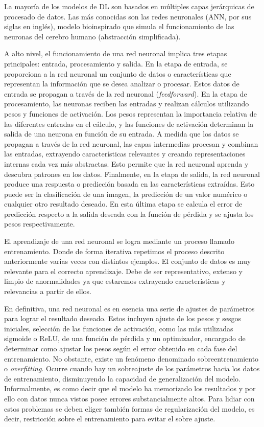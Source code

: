 La mayoría de los modelos de DL son basados en múltiples capas jerárquicas de 
procesado de datos. Las más conocidas son las redes neuronales (ANN, por sus siglas 
en inglés), modelo bioinspirado que simula el funcionamiento de las neuronas del cerebro
humano (abstracción simplificada)\cite{ANNForPattern,ANNCambridge}. 

A alto nivel, el funcionamiento de una red neuronal implica tres etapas principales: 
entrada, procesamiento y salida. En la etapa de entrada, se proporciona a la red 
neuronal un conjunto de datos o características que representan la información 
que se desea analizar o procesar. Estos datos de entrada se propagan a través 
de la red neuronal (\emph{feedforward}). En la etapa de procesamiento, las neuronas reciben las entradas 
y realizan cálculos utilizando pesos y funciones de activación. Los pesos representan 
la importancia relativa de las diferentes entradas en el cálculo, y las funciones 
de activación determinan la salida de una neurona en función de su entrada. A medida que los datos se propagan a través de la red neuronal, las capas intermedias 
procesan y combinan las entradas, extrayendo características relevantes y creando 
representaciones internas cada vez más abstractas. Esto permite que la red neuronal aprenda y 
descubra patrones en los datos. Finalmente, en la etapa de salida, la red neuronal 
produce una respuesta o predicción basada en las características extraídas. 
Esto puede ser la clasificación de una imagen, la predicción de un valor numérico o 
cualquier otro resultado deseado. En esta última etapa se calcula el error de 
predicción respecto a la salida deseada con la función de pérdida y se ajusta 
los pesos respectivamente.

El aprendizaje de una red neuronal se logra mediante un proceso llamado entrenamiento.
Donde de forma iterativa repetimos el proceso descrito anteriormente varias veces 
con distintos ejemplos. El conjunto de datos es muy relevante para el correcto 
aprendizaje. Debe de ser representativo, extenso y limpio de anormalidades ya que 
estaremos extrayendo características y relevancias a partir de ellos.

En definitiva, una red neuronal es en esencia una serie de ajustes de parámetros para lograr el resultado deseado. 
Estos incluyen ajuste de los pesos y sesgos iniciales, selección de las funciones de activación, 
como las más utilizadas sigmoide o ReLU, de una función de pérdida y un optimizador, 
encargado de determinar como ajustar los pesos según el error obtenido en cada fase del entrenamiento.
No obstante, existe un fenómeno denominado sobreentrenamiento o \emph{overfitting}. 
Ocurre cuando hay un sobreajuste de los parámetros
hacia los datos de entrenamiento, disminuyendo la capacidad de generalización del modelo. 
Informalmente, es como decir que el modelo ha memorizado los resultados y por ello 
con datos nunca vistos posee errores substancialmente altos. Para lidiar con estos 
problemas se deben eliger también formas de regularización del modelo, es decir, 
restricción sobre el entrenamiento para evitar el sobre ajuste. 

